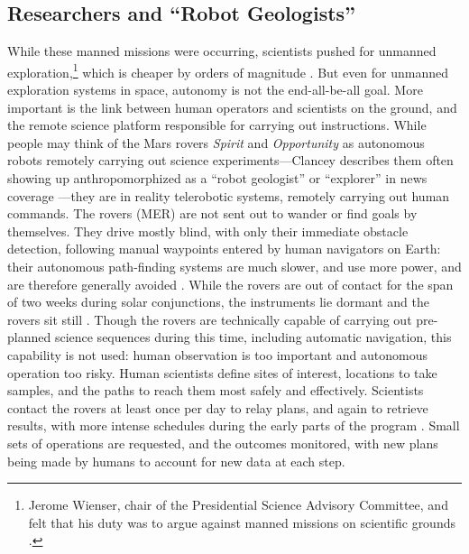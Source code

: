 \subsection{Researchers and ``Robot Geologists''}

 While these manned missions were occurring, scientists
 pushed for unmanned exploration,\footnote{Jerome
 Wienser, chair of the Presidential Science
   Advisory Committee, and felt that his duty was to argue against
   manned missions on scientific grounds \cite[Chapter 2]{Levine}.}
 which is cheaper by orders of magnitude
 \cite[p. 66]{coxMurray}. But even for
unmanned exploration systems in space, autonomy is not the
end-all-be-all goal. More important is the link between human
operators and scientists on the ground, and the remote science
platform responsible for carrying out instructions. 
While people may
think of the Mars rovers \emph{Spirit} and \emph{Opportunity} as
autonomous robots remotely carrying out science experiments---Clancey
describes them often showing up anthropomorphized as a ``robot 
geologist'' or 
``explorer'' in news coverage \cite[p. 7]{clancey}---they are
in reality telerobotic systems, remotely carrying out human commands.
The rovers (MER) are not 
sent out to wander or find goals by themselves. They drive mostly
blind, with only their immediate obstacle detection, following manual
waypoints entered by human navigators on Earth: their autonomous
path-finding systems are much slower, and use more power, and are
therefore generally avoided \cite[p. 118]{clancey}. While the rovers
are out of contact for the span of two weeks during solar
conjunctions, the instruments lie dormant and the rovers sit
still \cite[p. 25]{clancey}. Though the rovers are technically capable of
carrying out pre-planned science sequences during this time, including
automatic navigation, this capability is not used: human observation
is too important and
autonomous operation too risky. Human
scientists define sites of interest, locations to take samples, and
the paths to reach them most safely and effectively. Scientists
contact the rovers at least once per day to relay plans, and again
to retrieve results, with more intense schedules during the early
parts of the program \cite[p. 58]{clancey}. Small sets of
operations are requested, and the outcomes monitored, with new plans
being made by humans to account for new data at each step.

